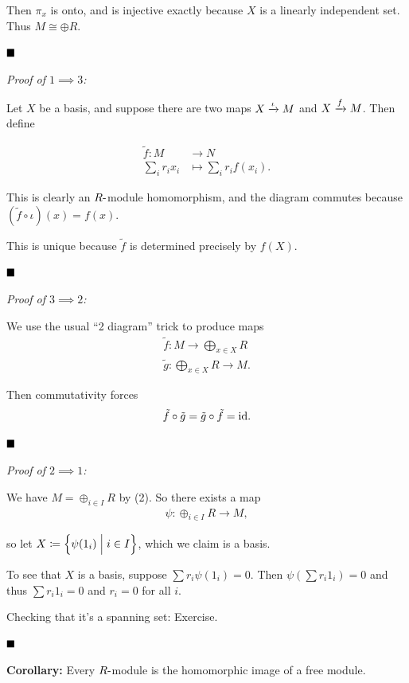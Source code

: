 Then \(\pi_x\) is onto, and is injective exactly because \(X\) is a
linearly independent set. Thus \(M \cong \oplus R\).

\(\qed\)

\emph{Proof of \(1 \implies 3\):}

Let \(X\) be a basis, and suppose there are two maps
\(X \xrightarrow{\iota} M\) and \(X \xrightarrow{f} M\). Then define

\begin{align*}
\tilde f: M &\to N \\
\sum_i r_i x_i &\mapsto \sum_i r_i f(x_i)
.\end{align*}

This is clearly an \(R{\hbox{-}}\)module homomorphism, and the diagram
commutes because \((\tilde f \circ \iota)(x) = f(x)\).

This is unique because \(\tilde f\) is determined precisely by \(f(X)\).

\(\qed\)

\emph{Proof of \(3 \implies 2\):}

We use the usual ``2 diagram'' trick to produce maps \begin{align*}
\tilde f: M \to \bigoplus_{x\in X} R \\
\tilde g: \bigoplus_{x\in X}R \to M
.\end{align*}

Then commutativity forces
\begin{align*}
\tilde f \circ \tilde g = \tilde g \circ \tilde f = \text{id}
.\end{align*}

\(\qed\)

\emph{Proof of \(2 \implies 1\):}

We have \(M = \oplus_{i\in I} R\) by (2). So there exists a map
\begin{align*}
\psi: \oplus_{i\in I} R \to M
,\end{align*}

so let \(X \coloneqq \left\{{\psi(1_i) \mathrel{\Big|} i\in I}\right\}\), which we claim
is a basis.

To see that \(X\) is a basis, suppose \(\sum r_i \psi(1_i) = 0\). Then
\(\psi(\sum r_i 1_i) = 0\) and thus \(\sum r_i 1_i = 0\) and \(r_i = 0\)
for all \(i\).

Checking that it's a spanning set: Exercise.

\(\qed\)

\textbf{Corollary:} Every \(R{\hbox{-}}\)module is the homomorphic image of a
free module.


